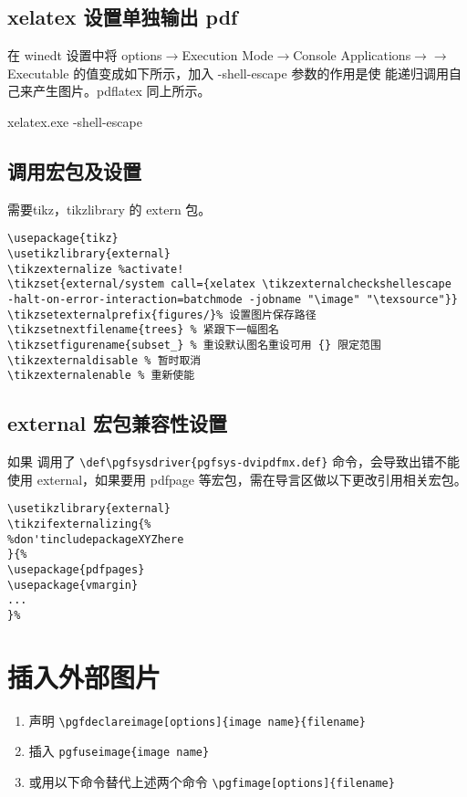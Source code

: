 \subsection{xelatex 设置单独输出 pdf}
在 winedt 设置中将 options$\rightarrow$Execution Mode$\rightarrow$Console Applications$\rightarrow$\XeLaTeX$\rightarrow$Executable 的值变成如下所示，加入 -shell-escape 参数的作用是使 \XeLaTeX 能递归调用自己来产生图片。pdflatex 同上所示。
\begin{cmd}
  xelatex.exe -shell-escape
\end{cmd}
\subsection{调用宏包及设置}
需要tikz，tikzlibrary 的 extern 包。
\begin{lstlisting}[language={[LaTeX]TeX}]
\usepackage{tikz}
\usetikzlibrary{external}
\tikzexternalize %activate!
\tikzset{external/system call={xelatex \tikzexternalcheckshellescape
-halt-on-error-interaction=batchmode -jobname "\image" "\texsource"}}
\tikzsetexternalprefix{figures/}% 设置图片保存路径
\tikzsetnextfilename{trees} % 紧跟下一幅图名
\tikzsetfigurename{subset_} % 重设默认图名重设可用 {} 限定范围
\tikzexternaldisable % 暂时取消
\tikzexternalenable % 重新使能
\end{lstlisting}
\subsection{external 宏包兼容性设置}
如果 \XeLaTeX 调用了 \verb|\def\pgfsysdriver{pgfsys-dvipdfmx.def}| 命令，会导致出错不能使用 external，如果要用 pdfpage 等宏包，需在导言区做以下更改引用相关宏包。
\begin{lstlisting}[language={[LaTeX]TeX}]
\usetikzlibrary{external}
\tikzifexternalizing{%
%don'tincludepackageXYZhere
}{%
\usepackage{pdfpages}
\usepackage{vmargin}
...
}%
\end{lstlisting}

\section{插入外部图片}

\begin{enumerate}
  \item 声明 \verb|\pgfdeclareimage[options]{image name}{filename}|
  \item 插入 \verb|pgfuseimage{image name}|
  \item 或用以下命令替代上述两个命令 \verb|\pgfimage[options]{filename}|
\end{enumerate}


